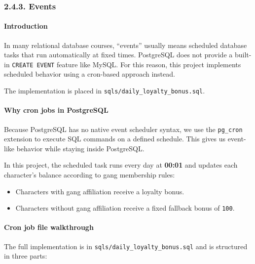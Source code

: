 \hypertarget{events-1}{%
\subsubsection{2.4.3. Events}\label{events-1}}

\hypertarget{introduction-1}{%
\paragraph{Introduction}\label{introduction-1}}

In many relational database courses, ``events'' usually means scheduled
database tasks that run automatically at fixed times. PostgreSQL does
not provide a built-in \texttt{CREATE\ EVENT} feature like MySQL. For
this reason, this project implements scheduled behavior using a
cron-based approach instead.

The implementation is placed in \texttt{sqls/daily\_loyalty\_bonus.sql}.

\hypertarget{why-cron-jobs-in-postgresql}{%
\paragraph{Why cron jobs in
PostgreSQL}\label{why-cron-jobs-in-postgresql}}

Because PostgreSQL has no native event scheduler syntax, we use the
\texttt{pg\_cron} extension to execute SQL commands on a defined
schedule. This gives us event-like behavior while staying inside
PostgreSQL.

In this project, the scheduled task runs every day at \textbf{00:01} and
updates each character's balance according to gang membership rules:

\begin{itemize}
\tightlist
\item
  Characters with gang affiliation receive a loyalty bonus.
\item
  Characters without gang affiliation receive a fixed fallback bonus of
  \texttt{100}.
\end{itemize}

\hypertarget{cron-job-file-walkthrough}{%
\paragraph{Cron job file walkthrough}\label{cron-job-file-walkthrough}}

The full implementation is in \texttt{sqls/daily\_loyalty\_bonus.sql}
and is structured in three parts:

